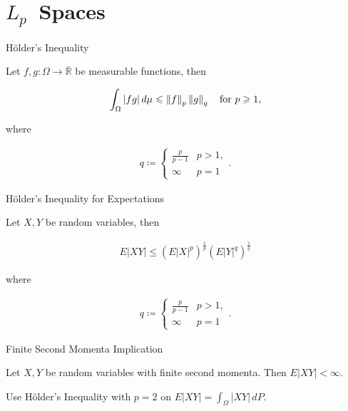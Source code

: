 
\section{\texorpdfstring{$L_p$}\ \ Spaces}

\begin{theorem}{}{H\"older's Inequality}

    Let $f,g: \Omega \to \overline{\mathbb{R}}$ be measurable functions, then

        \begin{align*}
            \int_{\Omega} |fg| \, d\mu \leq \Norm{f}_p \Norm{g}_q \quad \textrm{for } p \geq 1,
        \end{align*}

    where

        \begin{align*}
            q \coloneqq 
            \begin{cases}
                \frac{p}{p - 1} & p > 1, \\
                \infty & p = 1
            \end{cases}.
        \end{align*}

\end{theorem}

\begin{theorem}{}{H\"older's Inequality for Expectations}

    Let $X,Y$ be random variables, then

        \begin{align*}
            E|XY| \leq (E|X|^p)^{\frac{1}{p}} (E|Y|^q)^{\frac{1}{q}}
        \end{align*}

    where

        \begin{align*}
            q \coloneqq 
            \begin{cases}
                \frac{p}{p - 1} & p > 1, \\
                \infty & p = 1
            \end{cases}.
        \end{align*}

\end{theorem}

\begin{proposition}{}{Finite Second Momenta Implication}

    Let $X, Y$ be random variables with finite second momenta. Then $E|XY| < \infty$.

    \Hint Use H\"older's Inequality with $p = 2$ on $E|XY| = \int_{\Omega} |XY| \, dP$.

\end{proposition}


